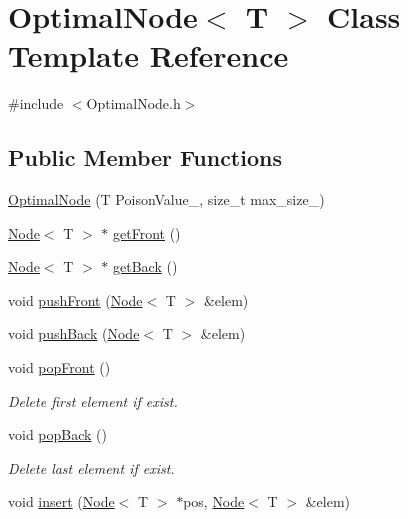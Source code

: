 \hypertarget{classOptimalList}{}\section{Optimal\+Node$<$ T $>$ Class Template Reference}
\label{classOptimalList}


{\ttfamily \#include $<$Optimal\+Node.\+h$>$}

\subsection*{Public Member Functions}
\begin{DoxyCompactItemize}
\item 
\hyperlink{classOptimalList_a30d03638f198e6ac9e52160ff7661dbd}{Optimal\+Node} (T Poison\+Value\+\_\+, size\+\_\+t max\+\_\+size\+\_\+)
\item 
\hyperlink{classList}{Node}$<$ T $>$ $\ast$ \hyperlink{classOptimalList_a00d74f7c423b28382c4ce7d0e962b30d}{get\+Front} ()
\item 
\hyperlink{classList}{Node}$<$ T $>$ $\ast$ \hyperlink{classOptimalList_ada40c2476927e5518a52874bc8dda530}{get\+Back} ()
\item 
void \hyperlink{classOptimalList_a5780692425a3653860f64cc59e26c657}{push\+Front} (\hyperlink{classList}{Node}$<$ T $>$ \&elem)
\item 
void \hyperlink{classOptimalList_aa7e86a832a4598304750fd3a0b0f9acb}{push\+Back} (\hyperlink{classList}{Node}$<$ T $>$ \&elem)
\item 
\mbox{\label{classOptimalList_aea718f1cda1208c812028f6e23d9ba9e}} 
void \hyperlink{classOptimalList_aea718f1cda1208c812028f6e23d9ba9e}{pop\+Front} ()
\begin{DoxyCompactList}\small\item\em Delete first element if exist. \end{DoxyCompactList}\item 
\mbox{\label{classOptimalList_a4032c2f90b225e007534c7bae916c34e}} 
void \hyperlink{classOptimalList_a4032c2f90b225e007534c7bae916c34e}{pop\+Back} ()
\begin{DoxyCompactList}\small\item\em Delete last element if exist. \end{DoxyCompactList}\item 
void \hyperlink{classOptimalList_a712d1c3f81c91ce3f55dda49e3f26229}{insert} (\hyperlink{classList}{Node}$<$ T $>$ $\ast$pos, \hyperlink{classList}{Node}$<$ T $>$ \&elem)

\end{DoxyCompactItemize}
